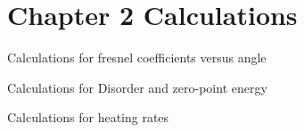 
\begin{savequote}[75mm]

\end{savequote}


\chapter{Chapter 2 Calculations}
\label{appendix:Ch2Cal}

Calculations for fresnel coefficients versus angle

Calculations for Disorder and zero-point energy

Calculations for heating rates

